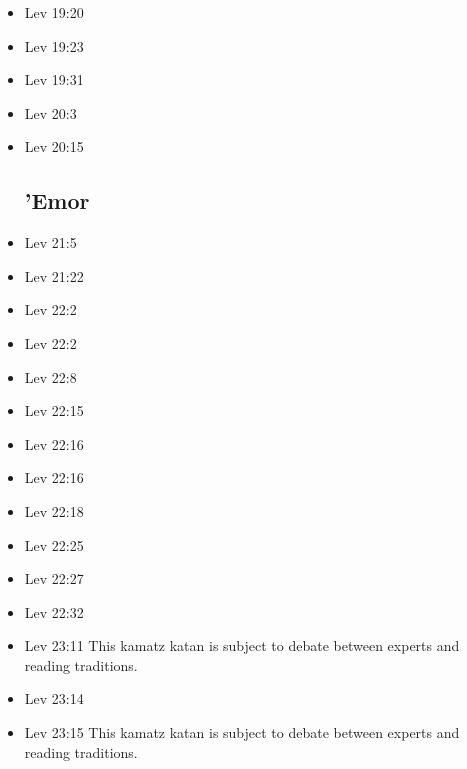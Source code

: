 \documentclass[14pt]{book}
\begin{document}
\begin{multicols}{2}
\begin{itemize}
\item Lev 19:20

\item Lev 19:23

\item Lev 19:31

\item Lev 20:3

\item Lev 20:15

\subsection{'Emor}

\item Lev 21:5

\item Lev 21:22

\item Lev 22:2

\item Lev 22:2

\item Lev 22:8

\item Lev 22:15

\item Lev 22:16

\item Lev 22:16

\item Lev 22:18

\item Lev 22:25

\item Lev 22:27

\item Lev 22:32

\item Lev 23:11 This kamatz katan is subject to debate between experts and reading traditions.

\item Lev 23:14

\item Lev 23:15 This kamatz katan is subject to debate between experts and reading traditions.


\end{itemize}
\end{multicols}
\end{document}

